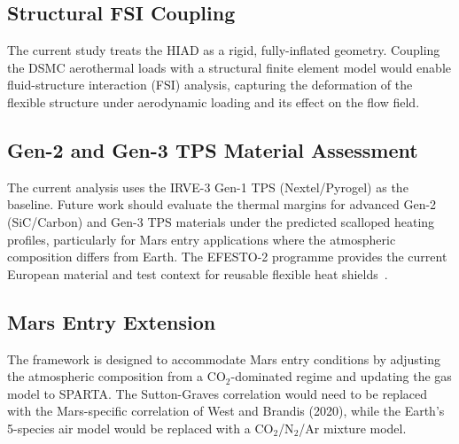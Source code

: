 \subsection{Structural FSI Coupling}
The current study treats the HIAD as a rigid, fully-inflated geometry. Coupling the DSMC aerothermal loads with a structural finite element model would enable fluid-structure interaction (FSI) analysis, capturing the deformation of the flexible structure under aerodynamic loading and its effect on the flow field.

\subsection{Gen-2 and Gen-3 TPS Material Assessment}
The current analysis uses the IRVE-3 Gen-1 TPS (Nextel/Pyrogel) as the baseline. Future work should evaluate the thermal margins for advanced Gen-2 (SiC/Carbon) and Gen-3 TPS materials under the predicted scalloped heating profiles, particularly for Mars entry applications where the atmospheric composition differs from Earth. The EFESTO-2 programme provides the current European material and test context for reusable flexible heat shields~\cite{Guidotti2024EFESTO2}.

\subsection{Mars Entry Extension}
The framework is designed to accommodate Mars entry conditions by adjusting the atmospheric composition from a CO$_2$-dominated regime and updating the gas model to SPARTA. The Sutton-Graves correlation would need to be replaced with the Mars-specific correlation of West and Brandis (2020), while the Earth's 5-species air model would be replaced with a CO$_2$/N$_2$/Ar mixture model.

